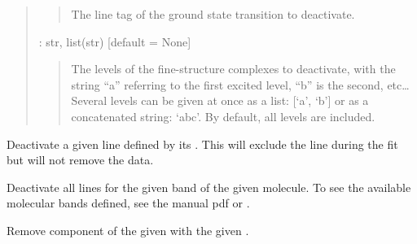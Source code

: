 \documentclass[letterpaper,10pt,english]{sphinxmanual}
\begin{document}
\begin{fulllineitems}
\begin{fulllineitems}
\begin{quote}
\begin{description}
\begin{quote}
The line tag of the ground state transition to deactivate.
\end{quote}

 : str, list(str)   {[}default = None{]}
\begin{quote}

The levels of the fine-structure complexes to deactivate,
with the string “a” referring to the first excited level,
“b” is the second, etc…
Several levels can be given at once as a list: {[}‘a’, ‘b’{]}
or as a concatenated string: ‘abc’.
By default, all levels are included.
\end{quote}

\end{description}\end{quote}

\end{fulllineitems}


\begin{fulllineitems}
\label{\detokenize{api:VoigtFit.DataSet.deactivate_line}}
Deactivate a given line defined by its .
This will exclude the line during the fit but will not remove the data.

\end{fulllineitems}


\begin{fulllineitems}
\label{\detokenize{api:VoigtFit.DataSet.deactivate_molecule}}
Deactivate all lines for the given band of the given molecule.
To see the available molecular bands defined, see the manual pdf
or .

\end{fulllineitems}


\begin{fulllineitems}
\label{\detokenize{api:VoigtFit.DataSet.delete_component}}
Remove component of the given  with the given .


\end{fulllineitems}
\end{fulllineitems}
\end{document}

